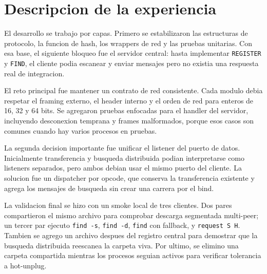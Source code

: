 \section{Descripcion de la experiencia}

El desarrollo se trabajo por capas. Primero se estabilizaron las estructuras de
protocolo, la funcion de hash, los wrappers de red y las pruebas unitarias. Con
esa base, el siguiente bloqueo fue el servidor central: hasta implementar
\texttt{REGISTER} y \texttt{FIND}, el cliente podia escanear y enviar mensajes
pero no existia una respuesta real de integracion.

El reto principal fue mantener un contrato de red consistente. Cada modulo
debia respetar el framing externo, el header interno y el orden de red para
enteros de 16, 32 y 64 bits. Se agregaron pruebas enfocadas para el handler del
servidor, incluyendo desconexion temprana y frames malformados, porque esos
casos son comunes cuando hay varios procesos en pruebas.

La segunda decision importante fue unificar el listener del puerto de datos.
Inicialmente transferencia y busqueda distribuida podian interpretarse como
listeners separados, pero ambos debian usar el mismo puerto del cliente. La
solucion fue un dispatcher por opcode, que conserva la transferencia existente
y agrega los mensajes de busqueda sin crear una carrera por el bind.

La validacion final se hizo con un smoke local de tres clientes. Dos pares
compartieron el mismo archivo para comprobar descarga segmentada multi-peer; un
tercer par ejecuto \texttt{find -s}, \texttt{find -d}, \texttt{find} con
fallback, y \texttt{request S H}. Tambien se agrego un archivo despues del
registro central para demostrar que la busqueda distribuida reescanea la
carpeta viva. Por ultimo, se elimino una carpeta compartida mientras los
procesos seguian activos para verificar tolerancia a hot-unplug.
